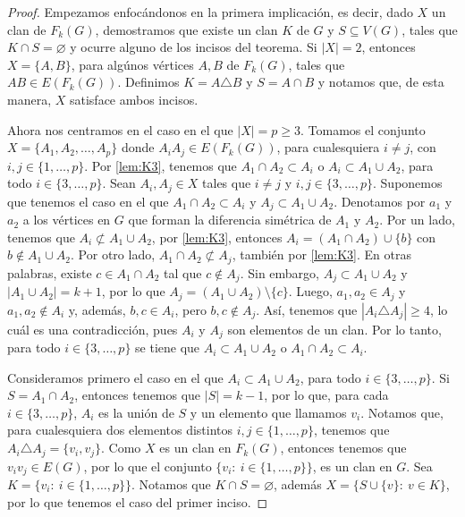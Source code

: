 \begin{proof}
    Empezamos enfoc\'andonos en la primera implicaci\'on, es decir, dado $X$ un
    clan de $F_k(G)$, demostramos que existe un clan $K$ de $G$ y $S \subseteq
    V(G)$, tales que $K \cap S = \varnothing$ y ocurre alguno de los incisos del
    teorema. Si $|X|=2$, entonces 
    \linebreak
    $X= \{A, B\}$, para alg\'unos v\'ertices $A,
    B$ de $F_k(G)$, tales que $AB \in E(F_k(G))$. Definimos $K = A \triangle B$
    y $S=A \cap B$ y notamos que, de esta manera, $X$ satisface ambos incisos.

    Ahora nos centramos en el caso en el que $|X|= p \geq 3$. Tomamos el
    conjunto $X=\{A_1, A_2, \dots, A_p\}$ donde $A_i{A_j} \in E(F_k(G))$, para
    cualesquiera $i\neq j$, con 
    \linebreak
    $i,j \in \{1, \dots, p\}$. Por \cref{lem:K3}, tenemos que $A_1\cap A_2
    \subset A_i$ o $A_i \subset A_1 \cup A_2$, para todo $i \in \{3, \dots, p
    \}$. Sean $A_i, A_j \in X$ tales que $i \neq j$ y $i, j \in \{3, \dots,
    p\}$. Suponemos que tenemos el caso en el que $A_1\cap A_2 \subset A_i$ y
    $A_j \subset A_1 \cup A_2$. Denotamos por $a_1$ y $a_2$ a los v\'ertices en
    $G$ que forman la diferencia sim\'etrica de $A_1$ y $A_2$. Por un lado,
    tenemos que $A_i \not\subset A_1\cup A_2$, por \cref{lem:K3}, entonces $A_i
    = (A_1\cap A_2) \cup \{b\}$ con $b \notin A_1\cup A_2$. Por otro lado, $A_1
    \cap A_2 \not\subset A_j$, tambi\'en por \cref{lem:K3}. En otras palabras,
    existe $c \in A_1 \cap A_2$ tal que $c \notin A_j$. Sin embargo, $A_j
    \subset A_1 \cup A_2$ y $|A_1 \cup A_2| =k+1$, por lo que $A_j = (A_1 \cup
    A_2)\setminus \{c\}$. Luego, $a_1, a_2 \in A_j$ y $a_1, a_2 \notin A_i$ y,
    adem\'as, $b, c \in A_i$, pero $b, c \notin A_j$. As\'i, tenemos que $|A_i
    \triangle A_j| \geq 4$, lo cu\'al es una contradicci\'on, pues $A_i$ y $A_j$
    son elementos de un clan. Por lo tanto, para todo $i\in \{3, \dots, p\}$ se
    tiene que $A_i \subset A_1\cup A_2$ o $A_1 \cap A_2 \subset A_i$.

    Consideramos primero el caso en el que $A_i \subset A_1\cup A_2$, para todo
    $i\in \{3, \dots, p\}$. Si $S= A_1 \cap A_2$, entonces tenemos que $|S|
    =k-1$, por lo que, para cada $i \in \{3, \dots, p\}$, $A_i$ es la uni\'on de
    $S$ y un elemento que llamamos $v_i$. Notamos que, para cualesquiera dos
    elementos distintos $i, j \in \{1, \dots, p\}$, tenemos que $A_i \triangle
    A_j = \{v_i, v_j\}$. Como $X$ es un clan en $F_k(G)$, entonces tenemos que
    $v_i{v_j} \in E(G)$, por lo que el conjunto $\{v_i\colon\ i \in \{1, \dots,
    p\}\}$, es un clan en $G$.   Sea $K = \{v_i\colon\ i \in \{1, \dots, p\}\}$.
    Notamos que  $K \cap S = \varnothing$, adem\'as $X= \{S \cup \{v\}\colon\ v
    \in K\}$, por lo que tenemos el caso del primer inciso.


\end{proof}
